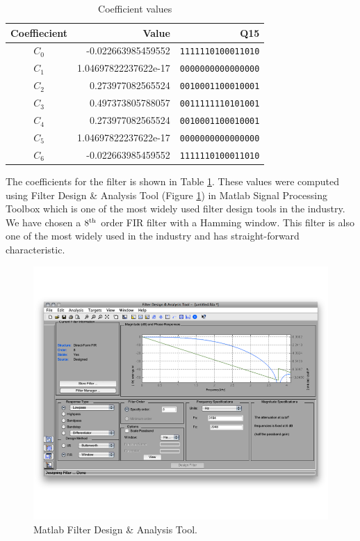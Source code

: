\begin{table}[htbp]
\centering
\begin{tabular}{ c | r | r }
\hline
Coeffiecient & Value & Q15 \\
\hline \hline
$C_0$ & -0.022663985459552   & \texttt{1111110100011010} \\
$C_1$ & 1.04697822237622e-17 & \texttt{0000000000000000} \\
$C_2$ & 0.273977082565524    & \texttt{0010001100010001}\\
$C_3$ & 0.497373805788057    & \texttt{0011111110101001}\\
$C_4$ & 0.273977082565524    & \texttt{0010001100010001}\\
$C_5$ & 1.04697822237622e-17 & \texttt{0000000000000000} \\
$C_6$ & -0.022663985459552   & \texttt{1111110100011010} \\
\end{tabular}
\caption{Coefficient values}
\label{tab:coefficients}
\end{table}

The coefficients for the filter is shown in Table \ref{tab:coefficients}. These values were computed using Filter Design \& Analysis Tool (Figure \ref{fig:matlab}) in Matlab Signal Processing Toolbox which is one of the most widely used filter design tools in the industry. We have chosen a $8^{\rm th}$ order FIR filter with a Hamming window. This filter is also one of the most widely used in the industry and has straight-forward characteristic.

\begin{figure}[htbp]
	\centering
	\includegraphics[width=6.5in]{images/matlab}
	\caption{Matlab Filter Design \& Analysis Tool.}
	\label{fig:matlab}
\end{figure}
